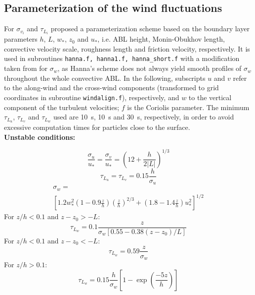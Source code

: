 \documentclass{egu}                  %
\begin{document}
\subsection{Parameterization of the wind fluctuations}

For $\sigma_{v_i}$ and $\tau_{L_i}$ \citet{hanna1982} proposed a
parameterization scheme based on the boundary layer parameters $h$, $L$, $w_*$,
$z_0$ and $u_*$, i.e.  ABL height, Monin-Obukhov length, convective velocity
scale, roughness length and friction velocity, respectively.  It is used in
subroutines \verb|hanna.f, hanna1.f, hanna_short.f| with a modification taken
from \citet{ryall1997} for $\sigma_w$, as Hanna's scheme does not always yield
smooth profiles of $\sigma_w$ throughout the whole convective ABL.  In the
following, subscripts $u$ and $v$ refer to the along-wind and the cross-wind
components (transformed to grid coordinates in subroutine \verb|windalign.f|),
respectively, and $w$ to the vertical component of the turbulent velocities;
$f$ is the Coriolis parameter.  The minimum $\tau_{L_u}$, $\tau_{L_v}$ and
$\tau_{L_w}$ used are 10~s, 10~s and 30~s, respectively, in order to avoid
excessive computation times for particles close to the surface.\\[0.3cm]

{\bf Unstable conditions:}

\begin{equation}
\frac{\sigma_u}{u_*}=\frac{\sigma_v}{u_*}=\left(12+\frac{h}{2|L|}\right)^{1/3}
\end{equation}
\begin{equation}
\tau_{L_u}=\tau_{L_v}=0.15\frac{h}{\sigma_u}
\end{equation}
\begin{multline}
\sigma_w=\\
\left[ 1.2 w_*^2 \left (1-0.9\frac{z}{h} \right )
\left ( \frac{z}{h} \right )^{2/3}
+\left (1.8-1.4 \frac{z}{h} \right ) u_*^2 \right]^{1/2}
\end{multline}
For $z/h<0.1$ and $z-z_0>-L$:
\begin{equation}
\tau_{L_w}=0.1\frac{z}{\sigma_w\left[0.55-0.38\left(z-z_0\right)/L\right]}
\end{equation}
For $z/h<0.1$ and $z-z_0<-L$:
\begin{equation}
\tau_{L_w}=0.59\frac{z}{\sigma_w}
\end{equation}
For $z/h>0.1$:
\begin{equation}
\tau_{L_w}=0.15\frac{h}{\sigma_w}\left[1-\exp\left(\frac{-5z}{h}\right)\right]
\end{equation}
\end{document}
